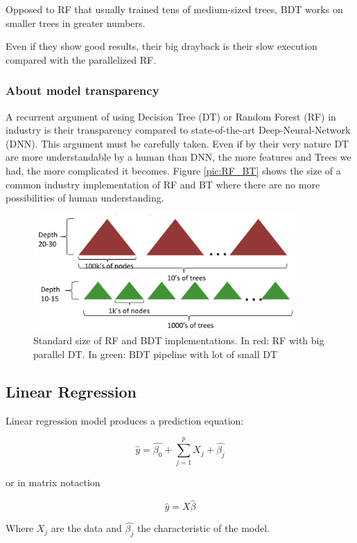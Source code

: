 Opposed to RF that usually trained tens of medium-sized trees, BDT works on smaller trees in greater numbers.

Even if they show good results, their big drayback is their slow execution compared with the parallelized RF.

\subsubsection{About model transparency}

A recurrent argument of using Decision Tree (DT) or Random Forest (RF) in industry is their transparency compared to state-of-the-art Deep-Neural-Network (DNN). This argument must be carefully taken. Even if by their very nature DT are more understandable by a human than DNN, the more features and Trees we had, the more complicated it becomes. Figure \ref{pic:RF_BT} shows the size of a common industry implementation of RF and BT where there are no more possibilities of human understanding.

\begin{figure}[H]%
 \centering
 \includegraphics[width=10cm]{./img/07/RF_BT.png}
 \caption{\label{pic:RF_BT.} Standard size of RF and BDT implementations.
 In red: RF with big parallel DT. In green: BDT pipeline with lot of small DT}
\end{figure}


\subsection{Linear Regression}

Linear regression model produces a prediction equation:

$$
\hat{y} = \hat{\beta_0} + \sum\limits_{j=1}^p  X_j + \hat{ \beta_j}
$$

or in matrix notaction

$$
\hat{y} =X \hat{ \beta}
$$

Where $X_j$ are the data and $\hat{\beta_j}$ the characteristic of the model. 

